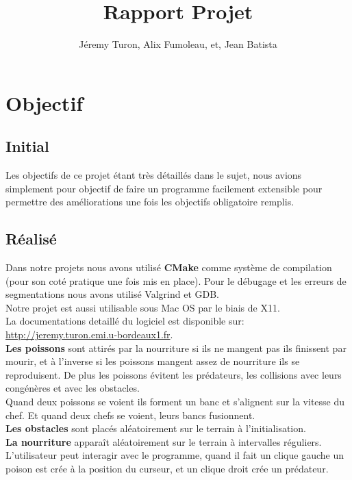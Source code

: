 \documentclass{article}
\title{Rapport Projet}
\author{Jéremy Turon, Alix Fumoleau, et, Jean Batista}
\begin{document}
\maketitle

 \tableofcontents

\newpage


\section{Objectif}
\label{objectif}
\subsection{Initial}

Les objectifs de ce projet étant très détaillés dans le sujet, nous avions simplement pour objectif de faire un programme facilement extensible pour permettre des améliorations une fois les objectifs obligatoire remplis.

\subsection{Réalisé}

Dans notre projets nous avons utilisé \textbf{CMake} comme système de compilation (pour son coté pratique une fois mis en place). Pour le débugage et les erreurs de segmentations nous avons utilisé Valgrind et GDB.
\\ Notre projet est aussi utilisable sous Mac OS par le biais de X11.
\\ La documentations detaillé du logiciel est disponible sur:  \\ \url{http://jeremy.turon.emi.u-bordeaux1.fr}.
\\ \textbf{Les poissons} sont attirés par la nourriture si ils ne mangent pas ils finissent par mourir, et à l'inverse si les poissons mangent assez de nourriture ils se reproduisent. 
De plus les poissons évitent les prédateurs, les collisions avec leurs congénères et avec les obstacles.
\\Quand deux poissons se voient ils forment un banc et s'alignent sur la vitesse du chef. Et quand deux chefs se voient, leurs bancs fusionnent.
\\ \textbf{ Les obstacles} sont placés aléatoirement sur le terrain à l'initialisation. 
\\ \textbf{La nourriture} apparaît aléatoirement sur le terrain à intervalles réguliers.
\\L'utilisateur peut interagir avec le programme, quand il fait un clique gauche un poison est crée à la position du curseur, et un clique droit crée un prédateur.
\end{document}
